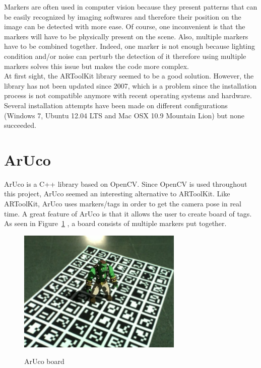Markers are often used in computer vision because they present patterns that can be easily recognized by imaging softwares and therefore their position on the image can be detected with more ease. Of course, one inconvenient is that the markers will have to be physically present on the scene. Also, multiple markers have to be combined together. Indeed, one marker is not enough because lighting condition and/or noise can perturb the detection of it therefore using multiple markers solves this issue but makes the code more complex.\\

At first sight, the ARToolKit library seemed to be a good solution. However, the library has not been updated since 2007, which is a problem since the installation process is not compatible anymore with recent operating systems and hardware. Several installation attempts have been made on different configurations (Windows 7, Ubuntu 12.04 LTS and Mac OSX 10.9 Mountain Lion) but none succeeded.\\


\section{ArUco}
ArUco is a C++ library based on OpenCV. Since OpenCV is used throughout this project, ArUco seemed an interesting alternative to ARToolKit. Like ARToolKit, ArUco uses markers/tags in order to get the camera pose in real time. A great feature of ArUco is that it allows the user to create board of tags. As seen in Figure~\ref{fig:board} \cite{aruco}, a board consists of multiple markers put together.\\

\begin{figure}
\caption{ArUco board}
\centering
    \includegraphics[width=0.7\textwidth]{images/board.jpg}
\label{fig:board}
\end{figure}

